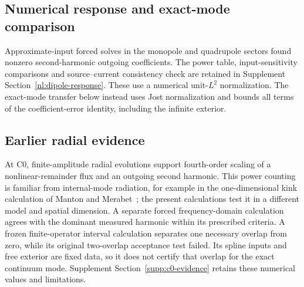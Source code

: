 \subsection{Numerical response and exact-mode comparison}
Approximate-input forced solves in the monopole and quadrupole sectors
found nonzero second-harmonic outgoing coefficients. The power table,
input-sensitivity comparisons and source--current consistency check are
retained in Supplement Section~\ref{nl:dipole-response}. These use a
numerical unit-$L^2$ normalization. The exact-mode transfer below instead
uses Jost normalization and bounds all terms of the coefficient-error
identity, including the infinite exterior.

\subsection{Earlier radial evidence}\label{nl:evidence}
At C0, finite-amplitude radial evolutions support fourth-order scaling
of a nonlinear-remainder flux and an outgoing second harmonic.
This power counting is familiar from internal-mode radiation, for example
in the one-dimensional kink calculation of
Manton and Merabet~\cite[Appendix A]{MantonMerabet1997}; the present
calculations test it in a different model and spatial dimension.
A separate forced frequency-domain calculation agrees with the dominant
measured harmonic within its prescribed criteria. A frozen finite-operator
interval calculation separates one necessary overlap from zero, while
its original two-overlap acceptance test failed. Its spline inputs and
free exterior are fixed data, so it does not certify that overlap for
the exact continuum mode. Supplement Section~\ref{supp:c0-evidence}
retains these numerical values and limitations.
